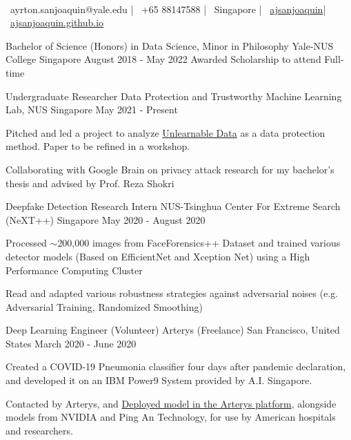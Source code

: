 \documentclass[]{awesome-cv}
\begin{document}
    
\begin{center}
	 \  \\
	{\faEnvelope\ ayrton.sanjoaquin@yale.edu} | {\faMobile\ +65 88147588} | {\faMapMarker\ Singapore} | {\faLinkedinSquare\ \href{https://www.linkedin.com/in/ajsanjoaquin/}{ajsanjoaquin}}| {\faLink\ \href{http://ajsanjoaquin.github.io/}{ajsanjoaquin.github.io}}
\end{center}
\begin{cventries}
	\cventry
	{Bachelor of Science (Honors) in Data Science, Minor in Philosophy}
	{Yale-NUS College}
	{Singapore}
	{August 2018 - May 2022}
	{Awarded Scholarship to attend Full-time}
\end{cventries}
\vspace{-2mm}
\begin{cventries}
	\cventry
	{Undergraduate Researcher}
	{Data Protection and Trustworthy Machine Learning Lab, NUS}
	{Singapore}
	{May 2021 - Present}
	{\begin{cvitems}
		\item {Pitched and led a project to analyze \href{https://arxiv.org/abs/2101.04898}{Unlearnable Data} as a data protection method. Paper to be refined in a workshop.}
		\item {Collaborating with Google Brain on privacy attack research for my bachelor's thesis and advised by Prof. Reza Shokri}
	\end{cvitems}}
	\cventry
	{Deepfake Detection Research Intern}
	{NUS-Tsinghua Center For Extreme Search (NeXT++)}
	{Singapore}
	{May 2020 - August 2020}
	{\begin{cvitems}
		\item {Processed $\sim$200,000 images from FaceForensics++ Dataset and trained various detector models (Based on EfficientNet and Xception Net) using a High Performance Computing Cluster}
		\item {Read and adapted various robustness strategies against adversarial noises (e.g. Adversarial Training, Randomized Smoothing)}
	\end{cvitems}}
	\cventry
	{Deep Learning Engineer (Volunteer)}
	{Arterys (Freelance)}
	{San Francisco, United States}
	{March 2020 - June 2020}
	{\begin{cvitems}
		\item {Created a COVID-19 Pneumonia classifier four days after pandemic declaration, and developed it on an IBM Power9 System provided by A.I. Singapore.}
		\item {Contacted by Arterys, and \href{https://marketplace.arterys.com/model/ayrtoncovidXR}{Deployed model in the Arterys platform}, 
		alongside models from NVIDIA and Ping An Technology, for use by American hospitals and researchers.}
	\end{cvitems}}
\end{cventries}
\end{document}

